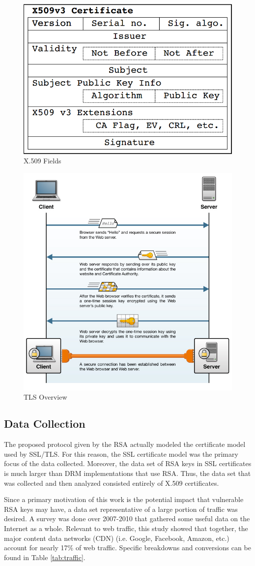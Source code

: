 \documentclass[12pt]{ucthesis}
\begin{document}
\begin{figure}
   \label{fig:x509}
   \centering
   \includegraphics[width=0.5\linewidth]{x509.png}
   \caption{X.509 Fields\cite{holz2011ssl}}
\end{figure}

\begin{figure}
   \label{fig:tls}
   \centering
   \includegraphics[width=0.5\linewidth]{tls.jpg}
   \caption{TLS Overview\cite{tlsconcepts}}
\end{figure}

\subsection{Data Collection}
\label{subsec:datacol}
The proposed protocol given by the RSA actually modeled the certificate model
used by SSL/TLS. For this reason, the SSL certificate model was the primary
focus of the data collected. Moreover, the data set of RSA keys in SSL
certificates is much larger than DRM implementations that use RSA. Thus, the
data set that was collected and then analyzed consisted entirely of X.509
certificates.

Since a primary motivation of this work is the potential impact that vulnerable
RSA keys may have, a data set representative of a large portion of traffic was
desired. A survey was done over 2007-2010 \cite{labovitz2011internet} that
gathered some useful data on the Internet as a whole. Relevant to web traffic,
this study showed that together, the major content data networks (CDN) (i.e.
Google, Facebook, Amazon, etc.) account for nearly 17\% of web traffic.
Specific breakdowns and conversions can be found in Table \ref{tab:traffic}.
\end{document}
